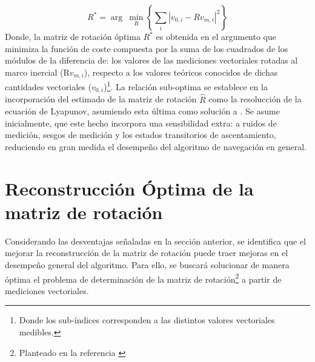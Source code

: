 \documentclass[conference]{IEEEtran}
\begin{document}
\begin{equation}\label{ProblemaOptimizacion}
R^*=\arg~\min_{R}\left\{\sum_i|v_{0,i}-Rv_{m,i}|^2\right\}
\end{equation}
Donde, la matriz de rotación óptima $R^*$ es obtenida en el argumento que minimiza la función de coste compuesta por la suma de los cuadrados de los módulos de la diferencia de: los valores de las mediciones vectoriales rotadas al marco inercial (R$v_{m,i}$), respecto a los valores teóricos conocidos de dichas cantidades vectoriales ($v_{0,i}$)\footnote{Donde los sub-índices corresponden a las distintos valores vectoriales medibles.}.
La relación sub-optima se establece en la incorporación del estimado de la matriz de rotación $\hat{R}$ como la resolucción de la ecuación de Lyapunov, asumiendo esta última como solución a \label{ProblemaOptimizacion}. Se asume inicialmente, que este hecho incorpora una sensibilidad extra: a ruidos de medición, sesgos de medición y los estados transitorios de ascentamiento, reduciendo en gran medida el desempeño del algoritmo de navegación en general. 
\section{Reconstrucción Óptima de la matriz de rotación\label{opt_reconstruction}}
Considerando las desventajas señaladas en la sección anterior, se identifica que el mejorar la reconstrucción de la matriz de rotación puede traer mejoras en el desempeño general del algoritmo. Para ello, se buscará solucionar de manera óptima el problema de determinación de la matriz de rotación\footnote{Planteado en la referencia \cite{Mahony2008}} a partir de mediciones vectoriales.
\end{document}
